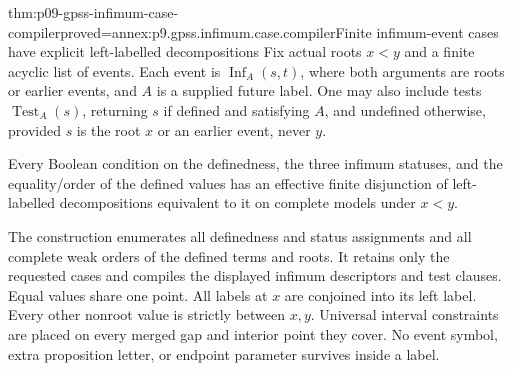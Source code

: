 \begin{hbtheorem}{thm:p09-gpss-infimum-case-compiler}{proved=annex:p9.gpss.infimum.case.compiler}{Finite infimum-event cases have explicit left-labelled decompositions}
Fix actual roots \(x<y\) and a finite acyclic list of events.
Each event is \(\operatorname{Inf}_A(s,t)\), where both arguments
are roots or earlier events, and \(A\) is a supplied future label.
One may also include tests \(\operatorname{Test}_A(s)\), returning
\(s\) if defined and satisfying \(A\), and undefined otherwise,
provided \(s\) is the root \(x\) or an earlier event, never \(y\).

Every Boolean condition on the definedness, the three infimum statuses,
and the equality/order of the defined values has an effective finite
disjunction of left-labelled decompositions equivalent to it on
complete models under \(x<y\).

The construction enumerates all definedness and status assignments and
all complete weak orders of the defined terms and roots. It retains
only the requested cases and compiles the displayed infimum descriptors
and test clauses. Equal values share one point. All labels at \(x\)
are conjoined into its left label. Every other nonroot value is
strictly between \(x,y\). Universal interval constraints are placed
on every merged gap and interior point they cover. No event symbol,
extra proposition letter, or endpoint parameter survives inside a label.
\end{hbtheorem}

